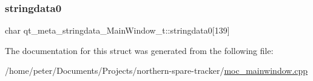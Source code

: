 \subsubsection{\texorpdfstring{stringdata0}{stringdata0}}
{\footnotesize\ttfamily char qt\+\_\+meta\+\_\+stringdata\+\_\+\+Main\+Window\+\_\+t\+::stringdata0\mbox{[}139\mbox{]}}



The documentation for this struct was generated from the following file\+:\begin{DoxyCompactItemize}
\item 
/home/peter/\+Documents/\+Projects/northern-\/spare-\/tracker/\hyperlink{moc__mainwindow_8cpp}{moc\+\_\+mainwindow.\+cpp}\end{DoxyCompactItemize}
